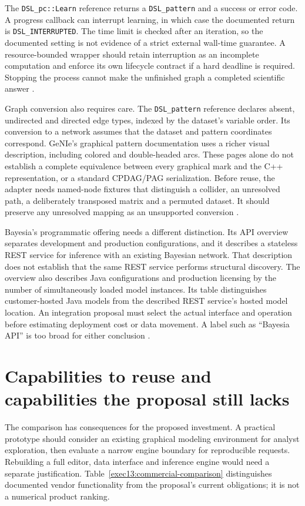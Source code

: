 The \texttt{DSL\_pc::Learn} reference returns a \texttt{DSL\_pattern} and a
success or error code. A progress callback can interrupt learning, in which
case the documented return is \texttt{DSL\_INTERRUPTED}. The time limit is
checked after an iteration, so the documented setting is not evidence of a
strict external wall-time guarantee. A resource-bounded wrapper should retain
interruption as an incomplete computation and enforce its own lifecycle
contract if a hard deadline is required. Stopping the process cannot make
the unfinished graph a completed scientific answer
\citep{exec13_smile_pc}.

Graph conversion also requires care. The \texttt{DSL\_pattern} reference
declares absent, undirected and directed edge types, indexed by the dataset's
variable order. Its conversion to a network assumes that the dataset and
pattern coordinates correspond. GeNIe's graphical pattern documentation
uses a richer visual description, including colored and double-headed arcs.
These pages alone do not establish a complete equivalence between every
graphical mark and the C++ representation, or a standard CPDAG/PAG
serialization. Before reuse, the adapter needs named-node fixtures that
distinguish a collider, an unresolved path, a deliberately transposed
matrix and a permuted dataset. It should preserve any unresolved mapping
as an unsupported conversion
\citep{exec13_smile_pattern,exec13_genie_pattern}.

Bayesia's programmatic offering needs a different distinction. Its API overview
separates development and production configurations, and it describes a
stateless REST service for inference with an existing Bayesian network.
That description does not establish that the same REST service performs
structural discovery. The overview also describes Java configurations and
production licensing by the number of simultaneously loaded model instances.
Its table distinguishes customer-hosted Java models from the described REST
service's hosted model location. An integration proposal must select the
actual interface and operation before estimating deployment cost or data
movement. A label such as ``Bayesia API'' is too broad for either conclusion
\citep{exec13_bayesia_api}.

\section{Capabilities to reuse and capabilities the proposal still lacks}

The comparison has consequences for the proposed investment. A practical
prototype should consider an existing graphical modeling environment for
analyst exploration, then evaluate a narrow engine boundary for reproducible
requests. Rebuilding a full editor, data interface and inference engine would
need a separate justification. Table~\ref{exec13:commercial-comparison}
distinguishes documented vendor functionality from the proposal's current
obligations; it is not a numerical product ranking.

